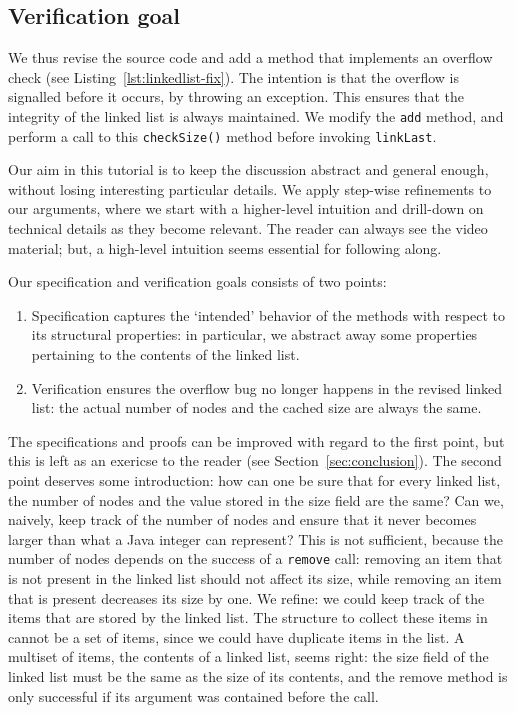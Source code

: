 \documentclass[runningheads]{llncs}
\begin{document}


\subsection{Verification goal}

We thus revise the source code and add a method that implements an overflow check (see Listing~\ref{lst:linkedlist-fix}). The intention is that the overflow is signalled before it occurs, by throwing an exception. This ensures that the integrity of the linked list is always maintained. We modify the \texttt{add} method, and perform a call to this \texttt{checkSize()} method before invoking \texttt{linkLast}.



Our aim in this tutorial is to keep the discussion abstract and general enough, without losing interesting particular details. We apply step-wise refinements to our arguments, where we start with a higher-level intuition and drill-down on technical details as they become relevant. The reader can always see the video material; but, a high-level intuition seems essential for following along.

Our specification and verification goals consists of two points:

\begin{enumerate}
    \item Specification captures the `intended' behavior of the methods with respect to its structural properties: in particular, we abstract away some properties pertaining to the contents of the linked list.
    \item Verification ensures the overflow bug no longer happens in the revised linked list: the actual number of nodes and the cached size are always the same.
\end{enumerate}

The specifications and proofs can be improved with regard to the first point, but this is left as an exericse to the reader (see Section~\ref{sec:conclusion}). The second point deserves some introduction: how can one be sure that for every linked list, the number of nodes and the value stored in the size field are the same? Can we, naively, keep track of the number of nodes and ensure that it never becomes larger than what a Java integer can represent? This is not sufficient, because the number of nodes depends on the success of a \texttt{remove} call: removing an item that is not present in the linked list should not affect its size, while removing an item that is present decreases its size by one. We refine: we could keep track of the items that are stored by the linked list. The structure to collect these items in cannot be a set of items, since we could have duplicate items in the list. A multiset of items, the contents of a linked list, seems right: the size field of the linked list must be the same as the size of its contents, and the remove method is only successful if its argument was contained before the call.
\end{document}
